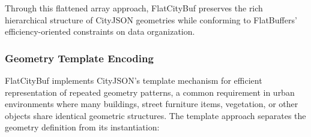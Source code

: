 Through this flattened array approach, FlatCityBuf preserves the rich hierarchical structure of CityJSON geometries while conforming to FlatBuffers' efficiency-oriented constraints on data organization.

\subsubsection{Geometry Template Encoding}
\label{methodology:feature_encoding:geometry_encoding:templates}

FlatCityBuf implements CityJSON's template mechanism for efficient representation of repeated geometry patterns, a common requirement in urban environments where many buildings, street furniture items, vegetation, or other objects share identical geometric structures. The template approach separates the geometry definition from its instantiation:

